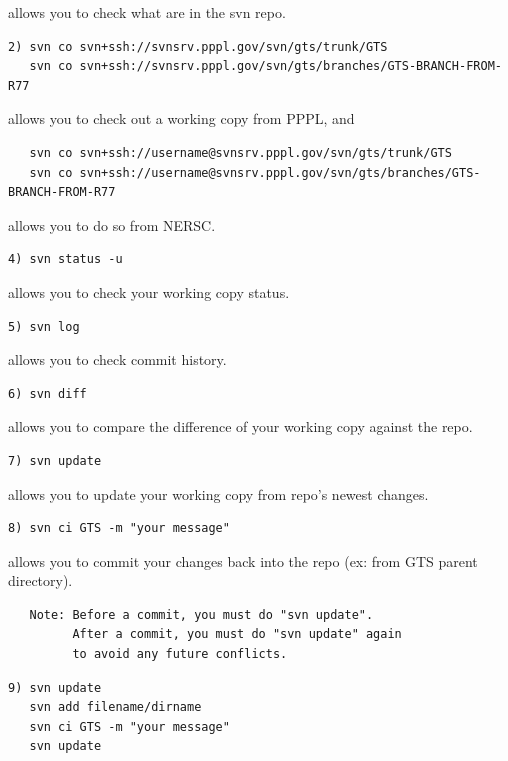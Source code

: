 \documentclass{report}
\begin{document}
\noindent
allows you to check what are in the svn repo.

\begin{verbatim}
2) svn co svn+ssh://svnsrv.pppl.gov/svn/gts/trunk/GTS
   svn co svn+ssh://svnsrv.pppl.gov/svn/gts/branches/GTS-BRANCH-FROM-R77
\end{verbatim}

\noindent
allows you to check out a working copy from PPPL, and

\begin{verbatim}
   svn co svn+ssh://username@svnsrv.pppl.gov/svn/gts/trunk/GTS
   svn co svn+ssh://username@svnsrv.pppl.gov/svn/gts/branches/GTS-BRANCH-FROM-R77
\end{verbatim}

\noindent
allows you to do so from NERSC.

\begin{verbatim}
4) svn status -u
\end{verbatim}

\noindent
allows you to check your working copy status.

\begin{verbatim}
5) svn log 
\end{verbatim}

\noindent
allows you to check commit history.

\begin{verbatim}
6) svn diff
\end{verbatim}

\noindent
allows you to compare the difference of your working copy against the repo.

\begin{verbatim}
7) svn update
\end{verbatim}

\noindent
allows you to update your working copy from repo's newest changes.

\begin{verbatim}
8) svn ci GTS -m "your message"
\end{verbatim}

\noindent
allows you to commit your changes back into the repo  (ex: from GTS parent directory).

\begin{verbatim}
   Note: Before a commit, you must do "svn update".
         After a commit, you must do "svn update" again
         to avoid any future conflicts.
\end{verbatim}

\begin{verbatim}
9) svn update
   svn add filename/dirname
   svn ci GTS -m "your message"
   svn update
\end{verbatim}
\end{document}
